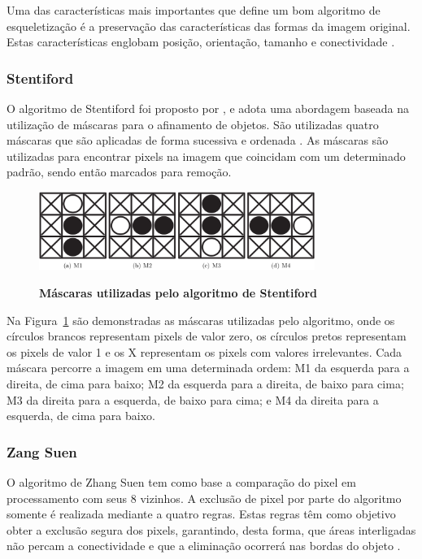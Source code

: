 \documentclass[12pt,oneside,a4paper,english,french,spanish,brazil,]{abntex2}
\begin{document}
Uma das características mais importantes que define um bom algoritmo de esqueletização é a preservação das características das formas da imagem original. Estas características englobam posição, orientação, tamanho e conectividade \cite{guilherme:2007}.

\subsubsection{Stentiford}

O algoritmo de Stentiford foi proposto por \citet{stentiford:1983}, e adota uma abordagem baseada na utilização de máscaras para o afinamento de objetos. São utilizadas quatro máscaras que são aplicadas de forma sucessiva e ordenada \cite{guilherme:2007}. As máscaras são utilizadas para encontrar pixels na imagem que coincidam com um determinado padrão, sendo então marcados para remoção.

\begin{figure}[ht]
\centering
\caption{\textbf{Máscaras utilizadas pelo algoritmo de Stentiford}}
\includegraphics[width=0.8\textwidth]{imagens/PDI_Stentiford_1.PNG}
\label{fig:PDI_Stentiford_1}
\end{figure}

Na Figura~\ref{fig:PDI_Stentiford_1} são demonstradas as máscaras utilizadas pelo algoritmo, onde os círculos brancos representam pixels de valor zero, os círculos pretos representam os pixels de valor 1 e os X representam os pixels com valores irrelevantes. Cada máscara percorre a imagem em uma determinada ordem: M1 da esquerda para a direita, de cima para baixo; M2 da esquerda para a direita, de baixo para cima; M3 da direita para a esquerda, de baixo para cima; e M4 da direita para a esquerda, de cima para baixo.


\subsubsection{Zang Suen}

O algoritmo de Zhang Suen \cite{zhang:1984} tem como base a comparação do pixel em processamento com seus 8 vizinhos. A exclusão de pixel por parte do algoritmo somente é realizada mediante a quatro regras. Estas regras têm como objetivo obter a exclusão segura dos pixels, garantindo, desta forma, que áreas interligadas não percam a conectividade e que a eliminação ocorrerá nas bordas do objeto \cite{guilherme:2007}.
\end{document}
